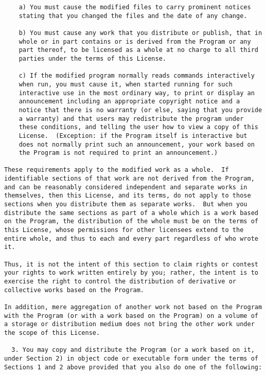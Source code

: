 \begin{verbatim}
    a) You must cause the modified files to carry prominent notices
    stating that you changed the files and the date of any change.

    b) You must cause any work that you distribute or publish, that in
    whole or in part contains or is derived from the Program or any
    part thereof, to be licensed as a whole at no charge to all third
    parties under the terms of this License.

    c) If the modified program normally reads commands interactively
    when run, you must cause it, when started running for such
    interactive use in the most ordinary way, to print or display an
    announcement including an appropriate copyright notice and a
    notice that there is no warranty (or else, saying that you provide
    a warranty) and that users may redistribute the program under
    these conditions, and telling the user how to view a copy of this
    License.  (Exception: if the Program itself is interactive but
    does not normally print such an announcement, your work based on
    the Program is not required to print an announcement.)

These requirements apply to the modified work as a whole.  If
identifiable sections of that work are not derived from the Program,
and can be reasonably considered independent and separate works in
themselves, then this License, and its terms, do not apply to those
sections when you distribute them as separate works.  But when you
distribute the same sections as part of a whole which is a work based
on the Program, the distribution of the whole must be on the terms of
this License, whose permissions for other licensees extend to the
entire whole, and thus to each and every part regardless of who wrote it.

Thus, it is not the intent of this section to claim rights or contest
your rights to work written entirely by you; rather, the intent is to
exercise the right to control the distribution of derivative or
collective works based on the Program.

In addition, mere aggregation of another work not based on the Program
with the Program (or with a work based on the Program) on a volume of
a storage or distribution medium does not bring the other work under
the scope of this License.

  3. You may copy and distribute the Program (or a work based on it,
under Section 2) in object code or executable form under the terms of
Sections 1 and 2 above provided that you also do one of the following:


\end{verbatim}
